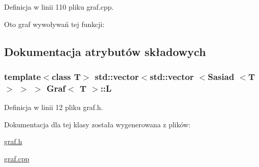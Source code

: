 \-Definicja w linii 110 pliku graf.\-cpp.



\-Oto graf wywoływań tej funkcji\-:




\subsection{\-Dokumentacja atrybutów składowych}
\hypertarget{class_graf_a974bf8b9ffcea59e13c6812f479c69af}{
\subsubsection[{\-L}]{\setlength{\rightskip}{0pt plus 5cm}template$<$class \-T$>$ std\-::vector$<$std\-::vector $<${\bf \-Sasiad} $<$\-T$>$ $>$ $>$ {\bf \-Graf}$<$ \-T $>$\-::{\bf \-L}}}\label{class_graf_a974bf8b9ffcea59e13c6812f479c69af}


\-Definicja w linii 12 pliku graf.\-h.



\-Dokumentacja dla tej klasy została wygenerowana z plików\-:\begin{DoxyCompactItemize}
\item 
\hyperlink{graf_8h}{graf.\-h}\item 
\hyperlink{graf_8cpp}{graf.\-cpp}\end{DoxyCompactItemize}

